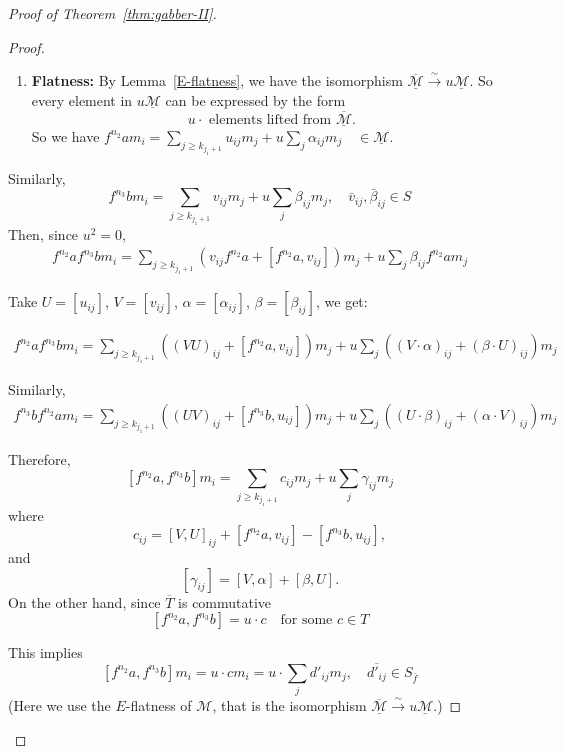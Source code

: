 \begin{proof}[Proof of Theorem~\ref{thm:gabber-II}]
\begin{proof}
\begin{remark}
\begin{enumerate}
				\item \textbf{Flatness:}
				      By Lemma~\ref{E-flatness}, we have the isomorphism $\overline{\underline{\mathcal{M}}} \xrightarrow{\sim} u \underline{\mathcal{M}}$. So every element in $u\underline{\mathcal{M}}$ can be expressed by the form
				      \[
					      u \cdot \text{ elements lifted from }\overline{\underline{\mathcal{M}}}.
				      \]
				      So we have $f^{n_2} a m_i = \sum_{j \ge k_{j_1+1}} u_{ij} m_j + u \sum_j \alpha_{ij} m_j\quad  \in \underline{\mathcal{M}}$.
			\end{enumerate}
		\end{remark}



		Similarly,
		\[
			f^{n_3} b m_i = \sum_{j \ge k_{j_1+1}} v_{ij} m_j + u \sum_j \beta_{ij} m_j,\quad \bar{v}_{ij}, \bar{\beta}_{ij} \in S
		\]
		Then, since $u^2=0$,
		\begin{align*}
			f^{n_2} a f^{n_3} b m_i = \sum_{j \ge k_{j_1+1}} \left( v_{ij} f^{n_2} a + [f^{n_2}a, v_{ij}] \right) m_j + u \sum_j \beta_{ij} f^{n_2} a m_j
		\end{align*}

		\noindent Take $U = [u_{ij}]$, $V = [v_{ij}]$, $\alpha = [\alpha_{ij}]$, $\beta = [\beta_{ij}]$, we get:

		\begin{align*}
			f^{n_2} a f^{n_3} b m_i
			= \sum_{j \ge k_{j_1+1}} \left( (VU)_{ij} + [f^{n_2}a, v_{ij}] \right) m_j
			+ u \sum_j \left( (V \cdot \alpha)_{ij} + (\beta \cdot U)_{ij} \right) m_j
		\end{align*}



		\noindent Similarly,
		\begin{align*}
			f^{n_3} b f^{n_2} a m_i
			= \sum_{j \ge k_{j_1+1}} \left( (UV)_{ij} + [f^{n_3}b, u_{ij}] \right) m_j
			+ u \sum_j \left( (U \cdot \beta)_{ij} + (\alpha \cdot V)_{ij} \right) m_j
		\end{align*}

		\noindent Therefore,
		\[
			[f^{n_2}a, f^{n_3}b] m_i = \sum_{j \ge k_{j_1+1}} c_{ij} m_j + u \sum_j \gamma_{ij} m_j
		\]
		where
		\[
			c_{ij} = [V, U]_{ij} + [f^{n_2}a, v_{ij}] - [f^{n_3}b, u_{ij}],
		\]
		and
		\[
			[\gamma_{ij}] = [V, \alpha] + [\beta, U].
		\]
		\noindent On the other hand, since $\overline{T}$ is commutative
		\[
			[f^{n_2}a, f^{n_3}b] = u \cdot c \quad \text{for some } c \in T
		\]

		\noindent This implies
		\[
			[f^{n_2}a, f^{n_3}b] m_i = u \cdot c m_i = u \cdot \sum_j d'_{ij} m_j, \quad \overline{d'_{ij}} \in S_{\bar f}
		\]
		\noindent (Here we use the $E$-flatness of $\mathcal{M}$, that is the isomorphism $\overline{\underline{\mathcal{M}}} \xrightarrow{\sim} u \underline{\mathcal{M}}$.)


\end{proof}
\end{proof}

